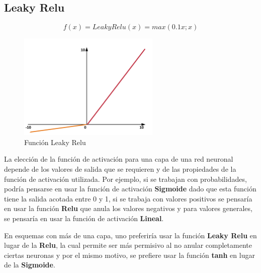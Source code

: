 \subsection{Leaky Relu}

\begin{equation}
    f(x)=LeakyRelu(x)=max(0.1x; x)
\end{equation}
\vspace{1cm}
\hspace{3.5cm}

\newline
\newline
\newline

\begin{figure}[H]
    \centering
    \includegraphics[height=2in]{image/relu}
    \caption{Función Leaky Relu}
    \label{fig:my_label}
\end{figure}

La elección de la función de activación para una capa de una red neuronal depende de los valores de salida que se requieren y de las propiedades de la función de activación utilizada. Por ejemplo, si se trabajan con probabilidades, podría pensarse en usar la función de activación \textbf{Sigmoide} dado que esta función tiene la salida acotada entre 0 y 1, si se trabaja con valores positivos se pensaría en usar la función \textbf{Relu} que anula los valores negativos y para valores generales, se pensaría en usar la función de activación \textbf{Lineal}.

En esquemas con más de una capa, uno preferiría usar la función \textbf{Leaky Relu} en lugar de la \textbf{Relu}, la cual permite ser más permisivo al no anular completamente ciertas neuronas y por el mismo motivo, se prefiere usar la función \textbf{tanh} en lugar de la \textbf{Sigmoide}.


